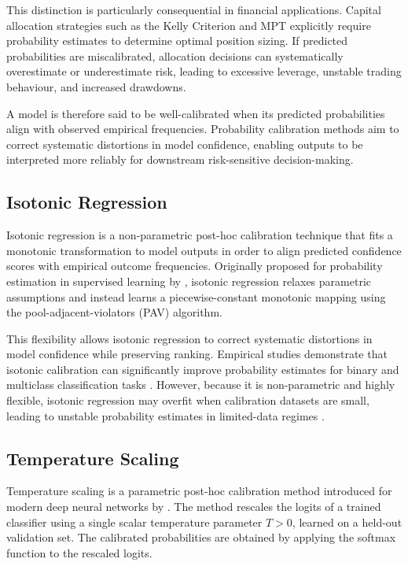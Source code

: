 \documentclass{l4proj}
\begin{document}
This distinction is particularly consequential in financial applications. Capital allocation strategies such as the Kelly Criterion and MPT explicitly require probability estimates to determine optimal position sizing. If predicted probabilities are miscalibrated, allocation decisions can systematically overestimate or underestimate risk, leading to excessive leverage, unstable trading behaviour, and increased drawdowns. 

A model is therefore said to be well-calibrated when its predicted probabilities align with observed empirical frequencies. Probability calibration methods aim to correct systematic distortions in model confidence, enabling outputs to be interpreted more reliably for downstream risk-sensitive decision-making.

\subsection{Isotonic Regression}

Isotonic regression is a non-parametric post-hoc calibration technique that fits a monotonic transformation to model outputs in order to align predicted confidence scores with empirical outcome frequencies. Originally proposed for probability estimation in supervised learning by \citet{10.1145/775047.775151}, isotonic regression relaxes parametric assumptions and instead learns a piecewise-constant monotonic mapping using the pool-adjacent-violators (PAV) algorithm. 

This flexibility allows isotonic regression to correct systematic distortions in model confidence while preserving ranking. Empirical studies demonstrate that isotonic calibration can significantly improve probability estimates for binary and multiclass classification tasks \cite{10.5555/645530.655658, niculescu2005predicting}. However, because it is non-parametric and highly flexible, isotonic regression may overfit when calibration datasets are small, leading to unstable probability estimates in limited-data regimes \cite{guo2017calibrationmodernneuralnetworks}. 

\subsection{Temperature Scaling}

Temperature scaling is a parametric post-hoc calibration method introduced for modern deep neural networks by \citet{guo2017calibrationmodernneuralnetworks}. The method rescales the logits of a trained classifier using a single scalar temperature parameter \(T > 0\), learned on a held-out validation set. The calibrated probabilities are obtained by applying the softmax function to the rescaled logits.
\end{document}
